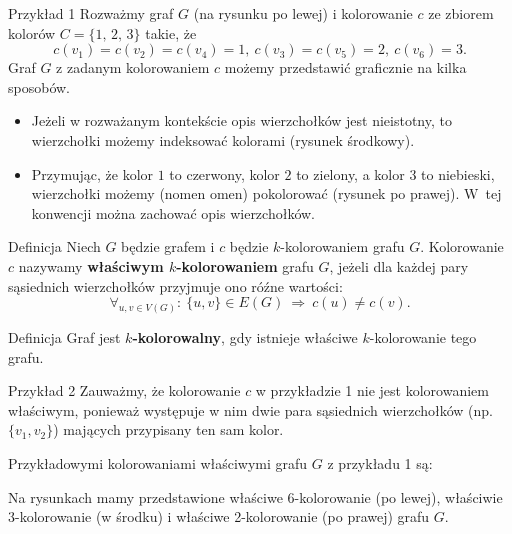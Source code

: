 \documentclass[a4paper,10pt]{beamer}
\begin{document}
\begin{frame}

\begin{exampleblock}{Przykład 1}
Rozważmy graf $G$ (na rysunku po lewej) i kolorowanie $c$ ze zbiorem kolorów $C=\{1,\,2,\,3\}$ takie, że
$$c(v_1)=c(v_2)=c(v_4)=1,\ c(v_3)=c(v_5)=2,\ c(v_6)=3.$$
Graf $G$ z zadanym kolorowaniem $c$ możemy przedstawić graficznie na kilka sposobów.
\begin{itemize}
\item Jeżeli w rozważanym kontekście opis wierzchołków jest nieistotny, to wierzchołki możemy indeksować kolorami (rysunek środkowy).
\item Przymując, że kolor $1$ to czerwony, kolor $2$ to zielony, a kolor $3$ to niebieski, wierzchołki możemy (nomen omen) pokolorować (rysunek po prawej). W~tej konwencji można zachować opis wierzchołków.
\end{itemize}

\begin{center}

\end{center}

\end{exampleblock}

\end{frame}


\begin{frame}	
\begin{block}{Definicja}
		Niech $G$ będzie grafem i $c$ będzie $k$-kolorowaniem grafu $G$. Kolorowanie $c$ nazywamy {\bf właściwym $k$-kolorowaniem} grafu $G$, jeżeli dla każdej pary sąsiednich wierzchołków przyjmuje ono róźne wartości:
$$\forall_{u,v\in V(G)}:\ \{u,v\}\in E(G)\ \Rightarrow\ c(u)\neq c(v).$$
\end{block}

\bigskip

\begin{block}{Definicja}
Graf jest {\bf $k$-kolorowalny}, gdy istnieje właściwe $k$-kolorowanie tego grafu.
\end{block}

\end{frame}


\begin{frame}
\begin{exampleblock}{Przykład 2}
Zauważmy, że kolorowanie $c$ w przykładzie 1 nie jest kolorowaniem właściwym, ponieważ występuje w nim dwie para sąsiednich wierzchołków (np. $\{v_1,v_2\}$) mających przypisany ten sam kolor.

\medskip

Przykładowymi kolorowaniami właściwymi grafu $G$ z przykładu 1 są:

\begin{center}

\end{center}

Na rysunkach mamy przedstawione właściwe 6-kolorowanie (po lewej), właściwie 3-kolorowanie (w środku) i właściwe 2-kolorowanie (po prawej) grafu $G$.

\end{exampleblock}

\end{frame}
\end{document}
